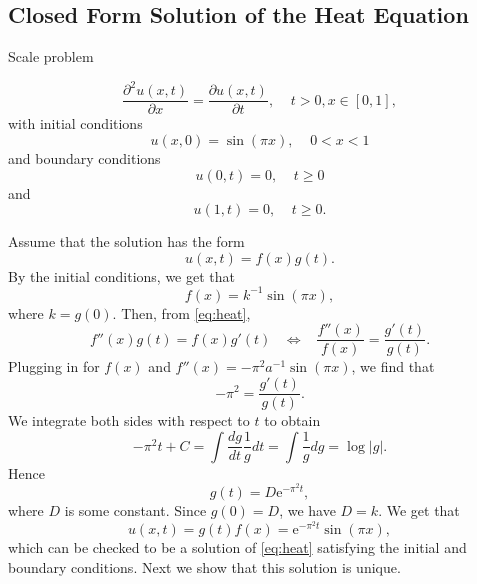 \subsection{Closed Form Solution of the Heat Equation}\label{sec:Heat analytic Theory}

Scale problem


\begin{equation}\label{eq:heat}
\frac{\partial^2 u(x,t)}{\partial x}= \frac{\partial u(x,t)}{\partial t},\;\;\;\;t>0,x\in[0,1],
\end{equation}
with initial conditions
\begin{equation*}
    u(x,0)=\sin(\pi x),\;\;\;\;0<x<1
\end{equation*}
and boundary conditions
\begin{equation*}
    u(0,t)=0,\;\;\;\;t\ge0
\end{equation*}
and
\begin{equation*}
    u(1,t)=0,\;\;\;\;t\ge0.
\end{equation*}

Assume that the solution has the form
\begin{equation*}
    u(x,t)=f(x)g(t).
\end{equation*}
By the initial conditions, we get that
\begin{equation*}
    f(x)=k^{-1}\sin(\pi x),
\end{equation*}
where $k=g(0)$. Then, from \cref{eq:heat},
\begin{equation*}
    f''(x)g(t) = f(x)g'(t)\;\;\;\Leftrightarrow\;\;\;\frac{f''(x)}{f(x)}=\frac{g'(t)}{g(t)}.
\end{equation*}
Plugging in for $f(x)$ and $f''(x)=-\pi^2a^{-1}\sin(\pi x)$, we find that
\begin{equation*}
    -\pi^2 = \frac{g'(t)}{g(t)}.
\end{equation*}
We integrate both sides with respect to $t$ to obtain
\begin{equation*}
    -\pi^2t+C = \int\frac{dg}{dt}\frac{1}{g}dt = \int\frac{1}{g}dg =\log |g|.
\end{equation*}
Hence
\begin{equation*}
    g(t)=D\mathrm{e}^{-\pi^2 t},
\end{equation*}
where $D$ is some constant. Since $g(0)=D$, we have $D=k$. We get that
\begin{equation*}
    u(x,t)=g(t)f(x)=\mathrm{e}^{-\pi^2 t}\sin(\pi x),
\end{equation*}
which can be checked to be a solution of \cref{eq:heat} satisfying the initial and boundary conditions. Next we show that this solution is unique.

